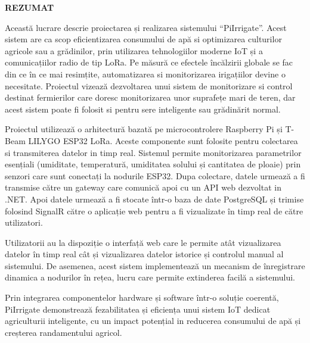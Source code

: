 \thispagestyle{abstractpagestyle}

\vspace*{36pt}

\begin{center}
\textbf{\fontsize{20pt}{24pt} \selectfont REZUMAT}
\end{center}

\vspace{24pt}

Această lucrare descrie proiectarea și realizarea sistemului “PiIrrigate”. Acest sistem are ca scop eficientizarea consumului de apă si optimizarea culturilor agricole sau a grădinilor, prin utilizarea tehnologiilor moderne IoT și a comunicațiilor radio de tip LoRa. Pe măsură ce efectele încălzirii globale se fac din ce în ce mai resimțite, automatizarea si monitorizarea irigațiilor devine o necesitate. Proiectul vizează dezvoltarea unui sistem de monitorizare si control destinat fermierilor care doresc monitorizarea unor suprafețe mari de teren, dar acest sistem poate fi folosit si pentru sere inteligente  sau grădinărit normal.

\vspace{12pt}

Proiectul utilizează o arhitectură bazată pe microcontrolere Raspberry Pi și T-Beam LILYGO ESP32 LoRa. Aceste componente sunt folosite pentru colectarea si transmiterea datelor in timp real. Sistemul permite monitorizarea parametrilor esențiali (umiditate, temperatură, umiditatea solului și cantitatea de ploaie) prin senzori care sunt conectați la nodurile ESP32. Dupa colectare,  datele urmează a fi transmise către un gateway care comunică apoi cu un API web dezvoltat in .NET. Apoi datele urmează a fi stocate într-o baza de date PostgreSQL și trimise folosind SignalR către o aplicație web pentru a fi vizualizate în timp real de către utilizatori.

\vspace{12pt}
Utilizatorii au la dispoziție o interfață web care le permite atât vizualizarea datelor în timp real cât și vizualizarea datelor istorice și controlul manual al sistemului. De asemenea, acest sistem implementează un mecanism de înregistrare dinamica a nodurilor în rețea, lucru care permite extinderea facilă a sistemului.

\vspace{12pt}
Prin integrarea componentelor hardware și software într-o soluție coerentă, PiIrrigate demonstrează fezabilitatea și eficiența unui sistem IoT dedicat agriculturii inteligente, cu un impact potențial in reducerea consumului de apă și creșterea randamentului agricol.

\vfill